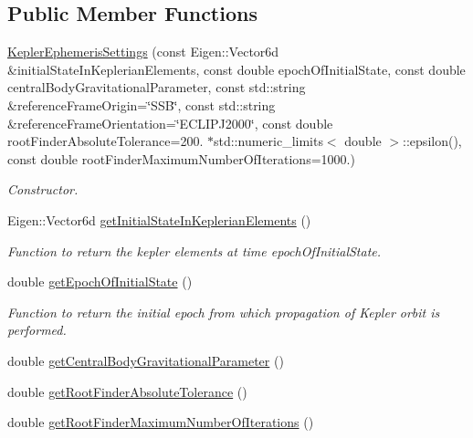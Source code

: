 \subsection*{Public Member Functions}
\begin{DoxyCompactItemize}
\item 
\hyperlink{classtudat_1_1simulation__setup_1_1KeplerEphemerisSettings_af359ded5cee4bbcf19e226d29a929a37}{Kepler\+Ephemeris\+Settings} (const Eigen\+::\+Vector6d \&initial\+State\+In\+Keplerian\+Elements, const double epoch\+Of\+Initial\+State, const double central\+Body\+Gravitational\+Parameter, const std\+::string \&reference\+Frame\+Origin=\char`\"{}S\+SB\char`\"{}, const std\+::string \&reference\+Frame\+Orientation=\char`\"{}E\+C\+L\+I\+P\+J2000\char`\"{}, const double root\+Finder\+Absolute\+Tolerance=200. $\ast$std\+::numeric\+\_\+limits$<$ double $>$\+::epsilon(), const double root\+Finder\+Maximum\+Number\+Of\+Iterations=1000.)
\begin{DoxyCompactList}\small\item\em Constructor. \end{DoxyCompactList}\item 
Eigen\+::\+Vector6d \hyperlink{classtudat_1_1simulation__setup_1_1KeplerEphemerisSettings_ab08e160ca168b5296434fb2f6f36e310}{get\+Initial\+State\+In\+Keplerian\+Elements} ()
\begin{DoxyCompactList}\small\item\em Function to return the kepler elements at time epoch\+Of\+Initial\+State. \end{DoxyCompactList}\item 
double \hyperlink{classtudat_1_1simulation__setup_1_1KeplerEphemerisSettings_a8fbfc310d0b5ceffe29faea308faf5db}{get\+Epoch\+Of\+Initial\+State} ()
\begin{DoxyCompactList}\small\item\em Function to return the initial epoch from which propagation of Kepler orbit is performed. \end{DoxyCompactList}\item 
double \hyperlink{classtudat_1_1simulation__setup_1_1KeplerEphemerisSettings_a33af0e38d1f3cf55bc7f68ff446d96c0}{get\+Central\+Body\+Gravitational\+Parameter} ()
\item 
double \hyperlink{classtudat_1_1simulation__setup_1_1KeplerEphemerisSettings_a214b4611c699ef8d9b2c15395f6a6115}{get\+Root\+Finder\+Absolute\+Tolerance} ()
\item 
double \hyperlink{classtudat_1_1simulation__setup_1_1KeplerEphemerisSettings_acb7bc87bb785de555ccdd9bb56d39f6d}{get\+Root\+Finder\+Maximum\+Number\+Of\+Iterations} ()
\end{DoxyCompactItemize}
